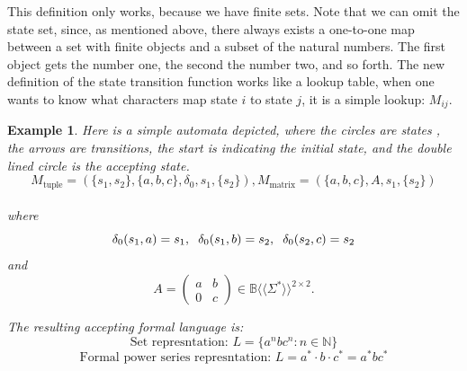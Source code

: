 \documentclass[12pt,letterpaper]{article}
\newtheorem{example}{Example}[section]
\newcommand{\fps}[1] {
\mathbb{#1}\langle \langle \Sigma^* \rangle \rangle
}
\begin{document}
This definition only works, because we have finite sets. Note that we can omit
the state set, since, as mentioned above, there always exists a one-to-one map between a set with finite objects and a subset of the natural numbers. The first object gets the number one, the second the number two, and so forth. The new definition of the state transition function works like a lookup table, when one wants to know what characters map state $i$ to state $j$, it is a simple lookup:
$M_{ij}$.


\begin{example}
  Here is a simple automata depicted, where the circles are states
  , the arrows are transitions, the start is indicating the initial 
  state, and the double lined circle is the accepting state.
  \[ 
    M_\text{tuple} = (\{s_1, s_2\}, \{a,b,c\}, \delta_0, s_1, \{s_2\}),
    M_\text{matrix} = (\{a,b,c\}, A, s_1, \{ s_2 \})
  \]\\
  where
  \[
    \delta_0(s_1, a) = s_1, \hspace{0.2cm} 
    \delta_0(s_1, b) = s_2, \hspace{0.2cm} \delta_0(s_2,c) = s_2
  \]
  and
  \[ 
    A = 
    \begin{pmatrix}
      a & b \\
      0 & c 
    \end{pmatrix} \in \fps{B}^{2\times 2}.
  \]
  \begin{center}
  \end{center}
  The resulting accepting formal language is:
  \[ \text{Set represntation: } L = \{a^nbc^n : n \in \mathbb{N}\}\]
  \[
    \text{Formal power series represntation: } L = a^*\cdot b\cdot c^* 
  = a^*bc^*
\]
\end{example}
\end{document}
